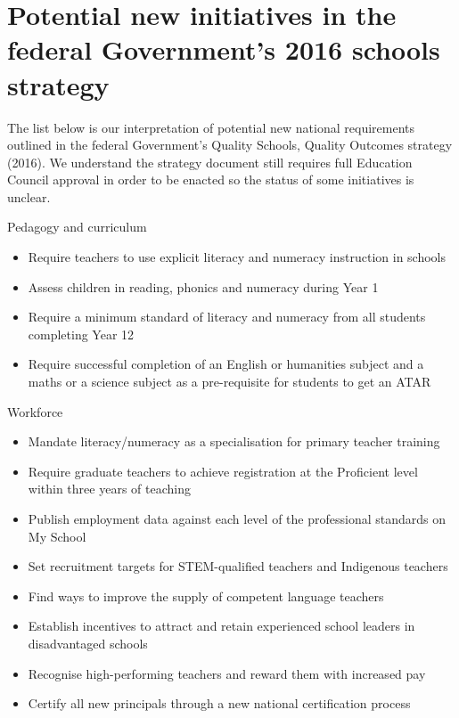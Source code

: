 \appendix

\chapter{Potential new initiatives in the federal Government's 2016 schools strategy}\label{chap:New_initiatives_quality_schools}

The list below is our interpretation of  potential new national requirements outlined in the federal Government's Quality Schools, Quality Outcomes strategy (2016). We understand the strategy document still requires full Education Council approval in order to be enacted so the status of some initiatives is unclear. 

Pedagogy and curriculum
\begin{itemize}
 \item Require teachers to use explicit literacy and numeracy instruction in schools
 \item Assess children in reading, phonics and numeracy during Year 1
 \item Require a minimum standard of literacy and numeracy from all students completing Year 12
 \item Require successful completion of an English or humanities subject and a maths or a science subject as a pre-requisite for students to get an ATAR
 \end{itemize}

Workforce
\begin{itemize}
 \item Mandate literacy/numeracy as a specialisation for primary teacher training
 \item Require graduate teachers to achieve registration at the Proficient level within three years of teaching
 \item Publish employment data against each level of the professional standards on My School 
 \item Set recruitment targets for STEM-qualified teachers and Indigenous teachers
 \item Find ways to improve the supply of competent language teachers
 \item Establish incentives to attract and retain experienced school leaders in disadvantaged schools
  \item Recognise high-performing teachers and reward them with increased pay
 \item Certify all new principals through a new national certification process
 \end{itemize}

